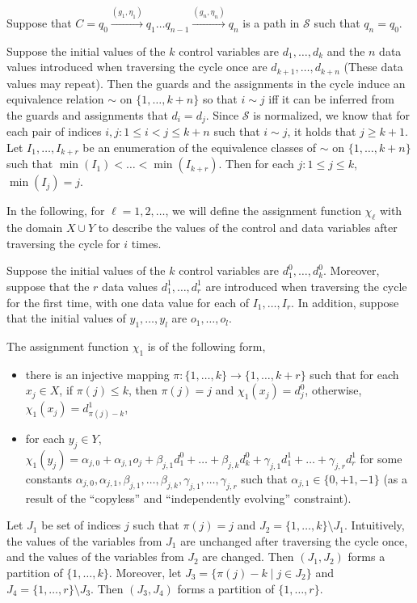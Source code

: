 \documentclass[runningheads,a4paper]{llncs}
\def\Ss{{\mathcal{S} }}
\begin{document}
Suppose that $C=q_0 \xrightarrow{(g_1,\eta_1)} q_1 \dots q_{n-1} \xrightarrow{(g_n, \eta_n)} q_n$ is a path in $\Ss$ such that $q_n = q_0$.  

Suppose the initial values of the $k$ control variables are $d_1,\dots, d_k$ and the $n$ data values introduced when traversing the cycle once are $d_{k+1},\dots,d_{k+n}$ (These data values may repeat). Then the guards and the assignments in the cycle induce an equivalence relation $\sim$ on $\{1,\dots, k+n\}$ so that  $i \sim j$ iff it can be inferred from the guards and assignments that $d_i = d_j$. Since $\Ss$ is normalized, we know that for each pair of indices $i,j: 1 \le i < j \le k+n$ such that $i \sim j$, it holds that $j \ge k+1$. Let $I_1,\dots, I_{k+r}$ be an enumeration of the equivalence classes of $\sim$ on $\{1,\dots, k+n\}$ such that $\min(I_1) < \dots < \min(I_{k+r})$. Then for each $j: 1 \le j \le k$, $\min(I_j)=j$.

In the following, for $\ell =1,2,\dots$, we will define the assignment function $\chi_\ell$ with the domain $X \cup Y$ to describe the values of the control and data variables after traversing the cycle for $i$ times. 

Suppose the initial values of the $k$ control variables are $d^0_1,\dots,d^0_k$. Moreover, suppose that the $r$ data values $d^1_{1},\dots,d^1_{r}$ are introduced when traversing the cycle for the first time, with one data value for each of $I_{1},\dots,I_{r}$. 
In addition, suppose that the initial values of $y_1,\dots, y_l$ are $o_1,\dots,o_l$. 

The assignment function $\chi_1$ is of the following form,
\begin{itemize}
\item there is an injective mapping $\pi: \{1,\dots,k\} \rightarrow \{1,\dots, k+r\}$ such that for each $x_j \in X$, if $\pi(j) \le k$, then $\pi(j)=j$ and $\chi_1(x_j)=d^0_{j}$, otherwise, $\chi_1(x_j)=d^1_{\pi(j)-k}$,
% 
\item for each $y_j \in Y$, $\chi_1(y_j) = \alpha_{j,0} + \alpha_{j,1} o_j + \beta_{j,1} d^0_1 + \dots + \beta_{j,k} d^0_k + \gamma_{j,1} d^1_1 +\dots + \gamma_{j,r} d^1_{r}$ for some constants $\alpha_{j,0},\alpha_{j,1}, \beta_{j,1},\dots,\beta_{j,k}, \gamma_{j,1},\dots,\gamma_{j,r}$ such that $\alpha_{j,1} \in \{0,+1,-1\}$ (as a result of the ``copyless'' and ``independently evolving'' constraint).
\end{itemize}

Let $J_1$ be set of indices $j$ such that $\pi(j)= j$ and $J_2 = \{1,\dots,k\} \setminus J_1$. Intuitively, the values of the variables from $J_1$ are  unchanged after traversing the cycle once, and the values of the variables from  $J_2$ are changed. Then $(J_1,J_2)$ forms a partition of $\{1,\dots,k\}$. Moreover, let $J_3=\{\pi(j)-k \mid j \in J_2\}$ and $J_4 = \{1,\dots,r\} \setminus J_3$. Then $(J_3,J_4)$ forms a partition of $\{1,\dots,r\}$.
\end{document}
